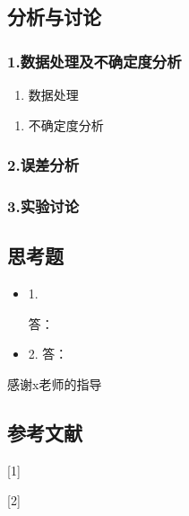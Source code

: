 \documentclass[12pt]{ctexart}
\begin{document}
\subsection*{分析与讨论}
\subsubsection*{1.数据处理及不确定度分析}
\begin{enumerate}[（1）]
   \item 数据处理
\end{enumerate}
\begin{enumerate}[（2）]
   \item 不确定度分析
\end{enumerate}

\subsubsection*{2.误差分析}
\subsubsection*{3.实验讨论}

\subsection*{思考题}
\begin{itemize}
   \item 1.
   
   答：
   
   \item 2.
   答：
\end{itemize}

感谢x老师的指导
\subsection*{参考文献}
[1]

[2]


\label{unknown}
\end{document}
